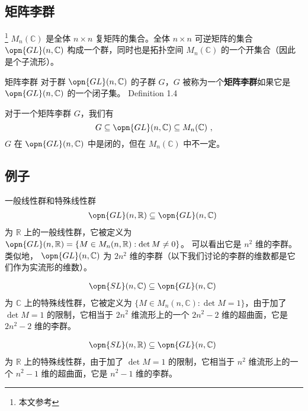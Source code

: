 
\begin{issues}
\issueDraft
\end{issues}


\subsection{矩阵李群}

\footnote{本文参考\cite{GTM222}} $M_n(\mathbb{C})$ 是全体 $n \times n$ 复矩阵的集合。全体 $n \times n$ 可逆矩阵的集合 $\opn{GL}(n, \mathbb{C})$ 构成一个群，同时也是拓扑空间 $M_n(\mathbb{C})$ 的一个开集合（因此是个子流形）。

\begin{definition}{矩阵李群}
对于群 $\opn{GL}(n, \mathbb{C})$ 的子群 $G$，$G$ 被称为一个\textbf{矩阵李群}如果它是 $\opn{GL}(n, \mathbb{C})$ 的一个闭子集。 Definition 1.4 \cite{GTM222} 
\end{definition}

对于一个矩阵李群 $G$，我们有
$$
G \subseteq \opn{GL}(n, \mathbb{C}) \subseteq M_n(\mathbb{C})~,
$$
$G$ 在 $\opn{GL}(n, \mathbb{C})$ 中是闭的，但在 $M_n(\mathbb{C})$ 中不一定。

\subsection{例子}

\begin{example}{一般线性群和特殊线性群}
\begin{equation}
\begin{aligned}
\opn{GL}(n, \mathbb{R}) \subseteq \opn{GL}(n, \mathbb{C})
\end{aligned}~
\end{equation}
为 $\mathbb R$ 上的一般线性群，它被定义为 $\opn{GL}(n,\mathbb R)=\{M\in M_n(n,\mathbb{R}): \det M\neq 0 \}$。
可以看出它是 $n^2$ 维的李群。类似地， ${\opn{GL}(n,\mathbb{C})}$ 为 $2n^2$ 维的李群（以下我们讨论的李群的维数都是它们作为实流形的维数）。

\begin{equation}
\begin{aligned}
\opn{SL}(n, \mathbb{C}) \subseteq \opn{GL}(n, \mathbb{C})
\end{aligned}~
\end{equation}
为 $\mathbb C$ 上的特殊线性群，它被定义为 $\{M\in M_n(n,\mathbb{C}): \det M=1 \}$，由于加了 $\det M=1$ 的限制，它相当于 $2n^2$ 维流形上的一个 $2n^2-2$ 维的超曲面，它是 $2n^2-2$ 维的李群。

\begin{equation}
\begin{aligned}
\opn{SL}(n, \mathbb{R}) \subseteq \opn{GL}(n, \mathbb{C})
\end{aligned}~
\end{equation}
为 $\mathbb R$ 上的特殊线性群，由于加了 $\det M=1$ 的限制，它相当于 $n^2$ 维流形上的一个 $n^2-1$ 维的超曲面，它是 $n^2-1$ 维的李群。
\end{example}

